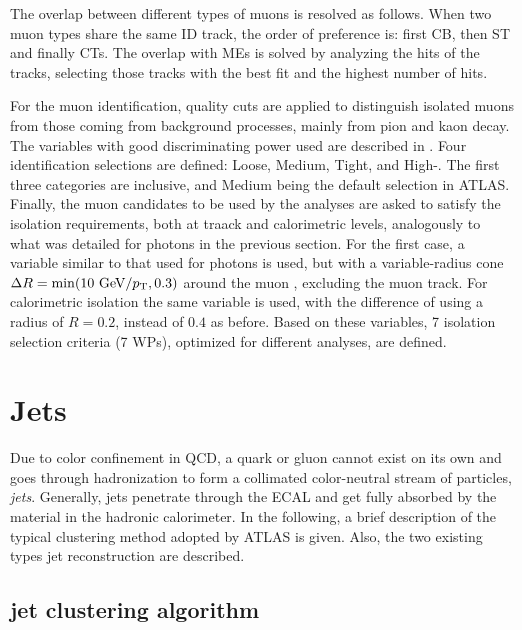 The overlap between different types of muons is resolved as follows. When two muon types share the same \ac{ID} track, the order of preference is: first \ac{CB}, then \ac{ST} and finally \acp{CT}. The overlap with \acp{ME} is solved by analyzing the hits of the tracks, selecting those tracks with the best fit and the highest number of hits.

For the muon identification, quality cuts are applied to distinguish isolated muons from those coming from background processes, mainly from pion and kaon decay.
The variables with good discriminating power used are described in . Four identification selections are defined: Loose, Medium, Tight, and High-\pt. The first three categories are inclusive, and Medium being the default selection in \ac{ATLAS}. Finally, the muon candidates to be used by the analyses are asked to satisfy the isolation requirements, both at traack and calorimetric levels, analogously to what was detailed for photons in the previous section. For the first case, a variable similar to that used for photons is used, but with a variable-radius cone \(\Delta R = \min(10~\text{GeV}/p_{\text{T}}, 0.3)\) around the muon \pt, excluding the muon track. For calorimetric isolation the same variable \etconefo is used, with the difference of using a radius of \(R=0.2\), instead of \(0.4\) as before. Based on these variables, 7 isolation selection criteria (7 \acp{WP}), optimized for different analyses, are defined.








\section{Jets}
\label{sec:objects:jets}

Due to color confinement in \ac{QCD}, a quark or gluon cannot exist on its own and goes through hadronization to form a collimated color-neutral stream of particles, \textit{jets}. Generally, jets penetrate through the \ac{ECAL} and get fully absorbed by the material in the hadronic calorimeter. In the following, a brief description of the typical clustering method adopted by \ac{ATLAS} is given. Also, the two existing types jet reconstruction are described.


\subsection{\texorpdfstring{\Antikt}{Anti-kT} jet clustering algorithm}

